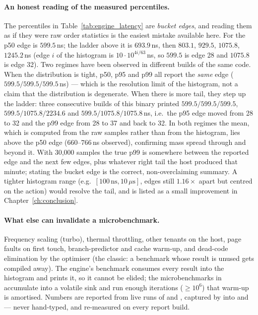 \paragraph{An honest reading of the measured percentiles.}
The percentiles in Table~\ref{tab:engine_latency} are \emph{bucket edges}, and reading them
as if they were raw order statistics is the easiest mistake available here. For
 the p50 edge is $599.5$\,ns; the ladder above it is
$693.9$\,ns, then $803.1$, $929.5$, $1075.8$, $1245.2$\,ns (edge $i$ of the histogram is
$10\cdot10^{4i/63}$\,ns, so $599.5$ is edge 28 and $1075.8$ is edge 32). Two regimes have
been observed in different builds of the same code. When the distribution is tight, p50, p95
and p99 all report the \emph{same} edge ($599.5 / 599.5 / 599.5$\,ns) --- which is the
resolution limit of the histogram, not a claim that the distribution is degenerate. When
there is more tail, they step up the ladder: three consecutive builds of this binary printed
$599.5/599.5/599.5$, $599.5/1075.8/2234.6$ and $599.5/1075.8/1075.8$\,ns, i.e.\ the p95
edge moved from 28 to 32 and the p99 edge from 28 to 37 and back to 32. In both regimes the
mean, which is computed from the raw samples rather than from the histogram, lies above the
p50 edge ($660$--$766$\,ns observed),
confirming mass spread through and beyond it. With 30{,}000 samples the true p99 is
somewhere between the reported edge and the next few edges, plus whatever right tail the
host produced that minute; stating the bucket edge is the correct, non-overclaiming
summary. A tighter histogram range (e.g.\ $[100\,\text{ns},10\,\mu\text{s}]$, edges still
$1.16\times$ apart but centred on the action) would resolve the tail, and is listed as a
small improvement in Chapter~\ref{ch:conclusion}.

\paragraph{What else can invalidate a microbenchmark.} Frequency scaling (turbo),
thermal throttling, other tenants on the host, page faults on first touch, branch-predictor
and cache warm-up, and dead-code elimination by the optimiser (the classic: a benchmark
whose result is unused gets compiled away). The engine's benchmark consumes every result
into the histogram and prints it, so it cannot be elided; the microbenchmarks in
 accumulate into a volatile sink and run enough iterations
($\ge10^6$) that warm-up is amortised. Numbers are reported from live runs of
 and , captured by
 into
 and  --- never
hand-typed, and re-measured on every report build.

